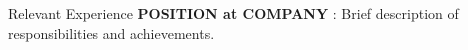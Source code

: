 \begin{rubric}{Relevant Experience}
%
%
	\textbf{POSITION at COMPANY} : Brief description of responsibilities and achievements.
%
%
\end{rubric}